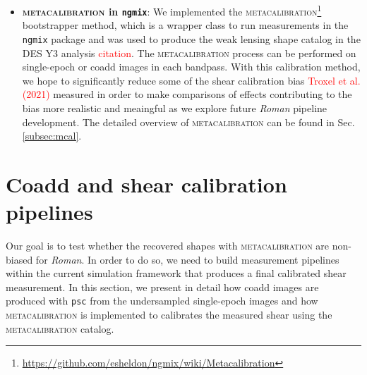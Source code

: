 \documentclass[fleqn,usenatbib]{mnras}
\begin{document}
\begin{itemize}
    \item \textbf{\textsc{metacalibration} in \texttt{ngmix}}: We implemented the \textsc{metacalibration}\footnote{\url{https://github.com/esheldon/ngmix/wiki/Metacalibration}} bootstrapper method, which is a wrapper class to run measurements in the \texttt{ngmix} package and was used to produce the weak lensing shape catalog in the DES Y3 analysis \textcolor{red}{citation}. The \textsc{metacalibration} process can be performed on single-epoch or coadd images in each bandpass. With this calibration method, we hope to significantly reduce some of the shear calibration bias \textcolor{red}{Troxel et al. (2021)} measured in order to make comparisons of effects contributing to the bias more realistic and meaingful as we explore future \emph{Roman} pipeline development. The detailed overview of \textsc{metacalibration} can be found in Sec.\ref{subsec:mcal}. 
\end{itemize}



\section{Coadd and shear calibration pipelines}
\label{sec:methods}
Our goal is to test whether the recovered shapes with \textsc{metacalibration} are non-biased for \emph{Roman}. In order to do so, we need to build measurement pipelines within the current simulation framework that produces a final calibrated shear measurement. In this section, we present in detail how coadd images are produced with \texttt{psc} from the undersampled single-epoch images and how \textsc{metacalibration} is implemented to calibrates the measured shear using the \textsc{metacalibration} catalog. 
\end{document}
